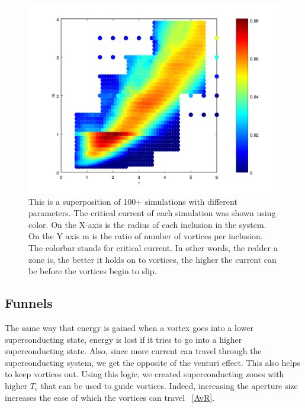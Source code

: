 \begin{figure}[htbp]
\begin{center}
\includegraphics[scale=.50]{HDFinal.png}
\caption{ This is a superposition of 100+ simulations with different parameters. The critical current of each simulation was shown using color. On the X-axis is the radius of each inclusion in the system. On the Y axis m is the ratio of number of vortices per inclusion. The colorbar stands for critical current. In other words, the redder a zone is, the better it holds on to vortices, the higher the current can be before the vortices begin to slip.}
\label{HDF}
\end{center}
\end{figure}
 

\subsection{Funnels}
The same way that energy is gained when a vortex goes into a lower superconducting state, energy is lost if it tries to go into a higher superconducting state. Also, since more current can travel through the superconducting system, we get the opposite of the venturi effect. This also helps to keep vortices out. Using this logic, we created superconducting zones with higher $T_c$ that can be used to guide vortices. Indeed, increasing the aperture size increases the ease of which the vortices can travel ~\ref{AvR}. 

